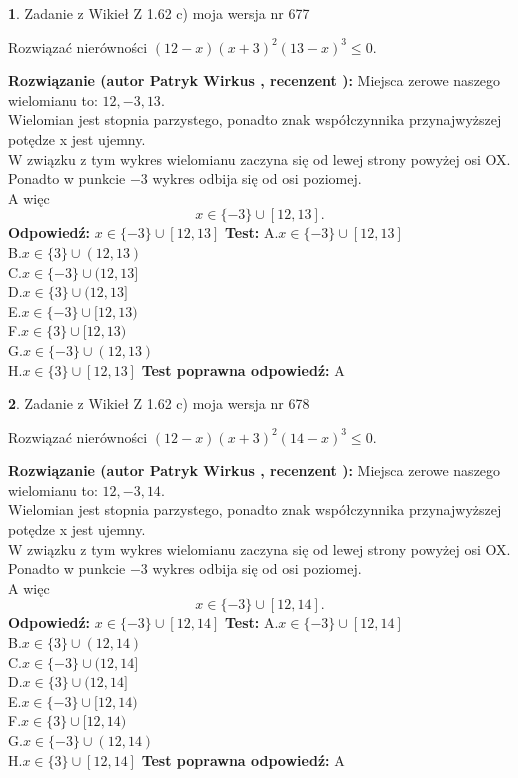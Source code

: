 \documentclass[12pt, a4paper]{article}
\theoremstyle{definition} %
\newtheorem{zad}{}
\newcommand{\zadStart}[1]{\begin{zad}#1\newline}
\newcommand{\zadStop}{\end{zad}}
\newcommand{\rozwStart}[2]{\noindent \textbf{Rozwiązanie (autor #1 , recenzent #2): }\newline}
\newcommand{\rozwStop}{\newline}
\newcommand{\odpStart}{\noindent \textbf{Odpowiedź:}\newline}
\newcommand{\odpStop}{\newline}
\newcommand{\testStart}{\noindent \textbf{Test:}\newline}
\newcommand{\testStop}{\newline}
\newcommand{\kluczStart}{\noindent \textbf{Test poprawna odpowiedź:}\newline}
\newcommand{\kluczStop}{\newline}
\begin{document}
\zadStart{Zadanie z Wikieł Z 1.62 c) moja wersja nr 677}

Rozwiązać nierówności $(12-x)(x+3)^{2}(13-x)^{3}\le0$.
\zadStop
\rozwStart{Patryk Wirkus}{}
Miejsca zerowe naszego wielomianu to: $12, -3, 13$.\\
Wielomian jest stopnia parzystego, ponadto znak współczynnika przy\linebreak najwyższej potędze x jest ujemny.\\ W związku z tym wykres wielomianu zaczyna się od lewej strony powyżej osi OX.\\
Ponadto w punkcie $-3$ wykres odbija się od osi poziomej.\\
A więc $$x \in \{-3\} \cup [12,13].$$
\rozwStop
\odpStart
$x \in \{-3\} \cup [12,13]$
\odpStop
\testStart
A.$x \in \{-3\} \cup [12,13]$\\
B.$x \in \{3\} \cup (12,13)$\\
C.$x \in \{-3\} \cup (12,13]$\\
D.$x \in \{3\} \cup (12,13]$\\
E.$x \in \{-3\} \cup [12,13)$\\
F.$x \in \{3\} \cup [12,13)$\\
G.$x \in \{-3\} \cup (12,13)$\\
H.$x \in \{3\} \cup [12,13]$
\testStop
\kluczStart
A
\kluczStop



\zadStart{Zadanie z Wikieł Z 1.62 c) moja wersja nr 678}

Rozwiązać nierówności $(12-x)(x+3)^{2}(14-x)^{3}\le0$.
\zadStop
\rozwStart{Patryk Wirkus}{}
Miejsca zerowe naszego wielomianu to: $12, -3, 14$.\\
Wielomian jest stopnia parzystego, ponadto znak współczynnika przy\linebreak najwyższej potędze x jest ujemny.\\ W związku z tym wykres wielomianu zaczyna się od lewej strony powyżej osi OX.\\
Ponadto w punkcie $-3$ wykres odbija się od osi poziomej.\\
A więc $$x \in \{-3\} \cup [12,14].$$
\rozwStop
\odpStart
$x \in \{-3\} \cup [12,14]$
\odpStop
\testStart
A.$x \in \{-3\} \cup [12,14]$\\
B.$x \in \{3\} \cup (12,14)$\\
C.$x \in \{-3\} \cup (12,14]$\\
D.$x \in \{3\} \cup (12,14]$\\
E.$x \in \{-3\} \cup [12,14)$\\
F.$x \in \{3\} \cup [12,14)$\\
G.$x \in \{-3\} \cup (12,14)$\\
H.$x \in \{3\} \cup [12,14]$
\testStop
\kluczStart
A
\kluczStop
\end{document}
